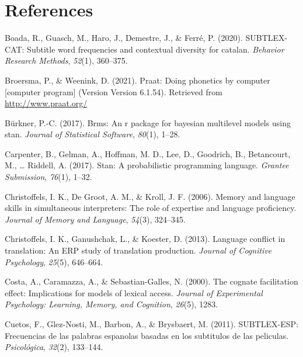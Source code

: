 \documentclass[
  english,
  man,floatsintext]{apa6}
\newlength{\cslhangindent}
\newenvironment{CSLReferences}[2] %
 {%
  \setlength{\parindent}{0pt}
  \ifodd #1 \everypar{\setlength{\hangindent}{\cslhangindent}}\ignorespaces\fi
  \ifnum #2 > 0
  \setlength{\parskip}{#2\baselineskip}
  \fi
 }%
 {}
\begin{document}
\hypertarget{references}{%
\section{References}\label{references}}

\begingroup
\setlength{\parindent}{-0.5in}
\setlength{\leftskip}{0.5in}

\hypertarget{refs}{}
\begin{CSLReferences}{1}{0}
\leavevmode{}%
Boada, R., Guasch, M., Haro, J., Demestre, J., \& Ferré, P. (2020). SUBTLEX-CAT: Subtitle word frequencies and contextual diversity for catalan. \emph{Behavior Research Methods}, \emph{52}(1), 360--375.

\leavevmode{}%
Broersma, P., \& Weenink, D. (2021). Praat: Doing phonetics by computer {[}computer program{]} (Version Version 6.1.54). Retrieved from \url{http://www.praat.org/}

\leavevmode{}%
Bürkner, P.-C. (2017). Brms: An r package for bayesian multilevel models using stan. \emph{Journal of Statistical Software}, \emph{80}(1), 1--28.

\leavevmode{}%
Carpenter, B., Gelman, A., Hoffman, M. D., Lee, D., Goodrich, B., Betancourt, M., \ldots{} Riddell, A. (2017). Stan: A probabilistic programming language. \emph{Grantee Submission}, \emph{76}(1), 1--32.

\leavevmode{}%
Christoffels, I. K., De Groot, A. M., \& Kroll, J. F. (2006). Memory and language skills in simultaneous interpreters: The role of expertise and language proficiency. \emph{Journal of Memory and Language}, \emph{54}(3), 324--345.

\leavevmode{}%
Christoffels, I. K., Ganushchak, L., \& Koester, D. (2013). Language conflict in translation: An ERP study of translation production. \emph{Journal of Cognitive Psychology}, \emph{25}(5), 646--664.

\leavevmode{}%
Costa, A., Caramazza, A., \& Sebastian-Galles, N. (2000). The cognate facilitation effect: Implications for models of lexical access. \emph{Journal of Experimental Psychology: Learning, Memory, and Cognition}, \emph{26}(5), 1283.

\leavevmode{}%
Cuetos, F., Glez-Nosti, M., Barbon, A., \& Brysbaert, M. (2011). SUBTLEX-ESP: Frecuencias de las palabras espanolas basadas en los subtitulos de las peliculas. \emph{Psicol{ó}gica}, \emph{32}(2), 133--144.


\end{CSLReferences}
\end{document}
